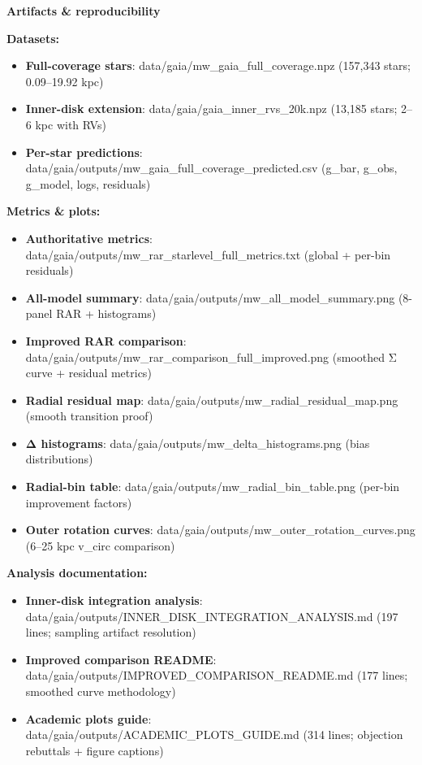 \documentclass[11pt,a4paper]{article}
\begin{document}
\textbf{Artifacts \& reproducibility}


\textbf{Datasets:}

\begin{itemize}
\item \textbf{Full-coverage stars}: data/gaia/mw\_gaia\_full\_coverage.npz (157,343 stars; 0.09–19.92 kpc)
\item \textbf{Inner-disk extension}: data/gaia/gaia\_inner\_rvs\_20k.npz (13,185 stars; 2–6 kpc with RVs)
\item \textbf{Per-star predictions}: data/gaia/outputs/mw\_gaia\_full\_coverage\_predicted.csv (g\_bar, g\_obs, g\_model, logs, residuals)
\end{itemize}


\textbf{Metrics \& plots:}

\begin{itemize}
\item \textbf{Authoritative metrics}: data/gaia/outputs/mw\_rar\_starlevel\_full\_metrics.txt (global + per-bin residuals)
\item \textbf{All-model summary}: data/gaia/outputs/mw\_all\_model\_summary.png (8-panel RAR + histograms)
\item \textbf{Improved RAR comparison}: data/gaia/outputs/mw\_rar\_comparison\_full\_improved.png (smoothed Σ curve + residual metrics)
\item \textbf{Radial residual map}: data/gaia/outputs/mw\_radial\_residual\_map.png (smooth transition proof)
\item \textbf{Δ histograms}: data/gaia/outputs/mw\_delta\_histograms.png (bias distributions)
\item \textbf{Radial-bin table}: data/gaia/outputs/mw\_radial\_bin\_table.png (per-bin improvement factors)
\item \textbf{Outer rotation curves}: data/gaia/outputs/mw\_outer\_rotation\_curves.png (6–25 kpc v\_circ comparison)
\end{itemize}


\textbf{Analysis documentation:}

\begin{itemize}
\item \textbf{Inner-disk integration analysis}: data/gaia/outputs/INNER\_DISK\_INTEGRATION\_ANALYSIS.md (197 lines; sampling artifact resolution)
\item \textbf{Improved comparison README}: data/gaia/outputs/IMPROVED\_COMPARISON\_README.md (177 lines; smoothed curve methodology)
\item \textbf{Academic plots guide}: data/gaia/outputs/ACADEMIC\_PLOTS\_GUIDE.md (314 lines; objection rebuttals + figure captions)
\end{itemize}
\end{document}
